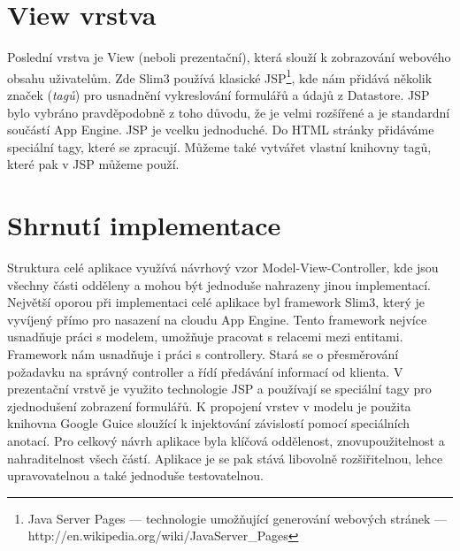 \section{View vrstva}
Poslední vrstva je View (neboli prezentační), která slouží k zobrazování webového obsahu uživatelům. Zde Slim3 používá klasické JSP\footnote{Java Server Pages --- technologie umožňující generování webových stránek ---  http://en.wikipedia.org/wiki/JavaServer\_Pages}, kde nám přidává několik značek (\emph{tagů}) pro usnadnění vykreslování formulářů a údajů z Datastore. JSP bylo vybráno pravděpodobně z toho důvodu, že je velmi rozšířené a je standardní součástí App Engine. JSP je vcelku jednoduché. Do HTML stránky přidáváme speciální tagy, které se zpracují. Můžeme také vytvářet vlastní knihovny tagů, které pak v JSP můžeme použí.

\section{Shrnutí implementace}
Struktura celé aplikace využívá návrhový vzor Model-View-Controller, kde jsou všechny části odděleny a mohou být jednoduše nahrazeny jinou implementací. Největší oporou při implementaci celé aplikace byl framework Slim3, který je vyvíjený přímo pro nasazení na cloudu App Engine. Tento framework nejvíce usnadňuje práci s modelem, umožňuje pracovat s relacemi mezi entitami. Framework nám usnadňuje i práci s controllery. Stará se o přesměrování požadavku na správný controller a řídí předávání informací od klienta. V prezentační vrstvě je využito technologie JSP a používají se speciální tagy pro zjednodušení zobrazení formulářů. K propojení vrstev v modelu je použita knihovna Google Guice sloužící k injektování závislostí pomocí speciálních anotací. Pro celkový návrh aplikace byla klíčová oddělenost, znovupoužitelnost a nahraditelnost všech částí. Aplikace je se pak stává libovolně rozšiřitelnou, lehce upravovatelnou a také jednoduše testovatelnou.